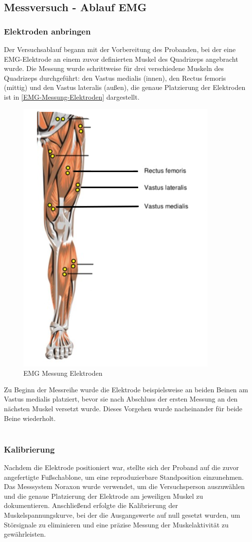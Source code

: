 \subsection{Messversuch - Ablauf EMG}

\subsubsection{Elektroden anbringen}

Der Versuchsablauf begann mit der Vorbereitung des Probanden, bei der eine EMG-Elektrode an einem zuvor definierten Muskel des Quadrizeps angebracht wurde. Die Messung wurde schrittweise für drei verschiedene Muskeln des Quadrizeps durchgeführt: den Vastus medialis (innen), den Rectus femoris (mittig) und den Vastus lateralis (außen), die genaue Platzierung der Elektroden ist in \autoref{EMG-Messung-Elektroden} dargestellt.
\begin{figure}[h!]
    \centering
    \includegraphics[width=0.5\linewidth]{img/EMG Muskeln.png}
    \caption{EMG Messung Elektroden \cite{EMG-FIBEL}}
    \label{EMG-Messung-Elektroden}
\end{figure}
Zu Beginn der Messreihe wurde die Elektrode beispielsweise an beiden Beinen am Vastus medialis platziert, bevor sie nach Abschluss der ersten Messung an den nächsten Muskel versetzt wurde. Dieses Vorgehen wurde nacheinander für beide Beine wiederholt.\\
\\
\subsubsection{Kalibrierung}
Nachdem die Elektrode positioniert war, stellte sich der Proband auf die zuvor angefertigte Fußschablone, um eine reproduzierbare Standposition einzunehmen. Das Messsystem Noraxon wurde verwendet, um die Versuchsperson auszuwählen und die genaue Platzierung der Elektrode am jeweiligen Muskel zu dokumentieren. Anschließend erfolgte die Kalibrierung der Muskelspannungskurve, bei der die Ausgangswerte auf null gesetzt wurden, um Störsignale zu eliminieren und eine präzise Messung der Muskelaktivität zu gewährleisten.\\
\\
